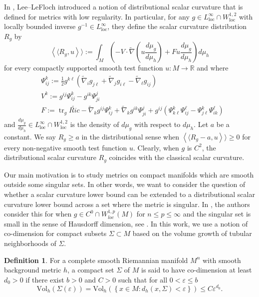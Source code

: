 \documentclass[12pt]{amsart}
\def\tr{\operatorname{tr}}
\theoremstyle{plain}
\theoremstyle{plain}
\theoremstyle{definition}
\newtheorem{definition}[subsection]{Definition}
\theoremstyle{remark}
\numberwithin{equation}{subsection}
\newcommand{\hdel}{\tilde{\nabla}}
\begin{document}
In \cite{lee_positive_2015}, Lee--LeFloch introduced a notion of distributional scalar curvature that is defined for metrics with low regularity. In particular, for any $g \in L^\infty_{\text{loc}}\cap W^{1,2}_{\text{loc}}$ with locally bounded inverse $g^{-1}\in L^\infty_{\text{loc}}$, they define the scalar curvature distribution $R_g$ by
\begin{equation}\label{eqn:distributional-scalar-defn}
    \left\langle\langle R_g, u\right\rangle\rangle := \int_M \left(-V\cdot\hdel\left(u\frac{d\mu_g}{d\mu_h}\right)+Fu\frac{d\mu_g}{d\mu_h}\right)d\mu_h
\end{equation}
for every compactly supported smooth test function $u:M\to\mathbb{R}$ and where
\begin{align*}
    &\Psi^k_{ij} := \frac{1}{2}g^{k\ell}\left(\hdel_ig_{j\ell}+\hdel_jg_{i\ell}-\hdel_{\ell}g_{ij}\right) \\
    &V^k := g^{ij}\Psi^{k}_{ij} - g^{ik}\Psi^{j}_{ji} \\
    &F := \tr_g\widetilde{Ric} - \hdel_kg^{ij}\Psi^k_{ij} + \hdel_kg^{ik}\Psi^{j}_{ji} + g^{ij}\left(\Psi^{k}_{k\ell}\Psi^{\ell}_{ij} - \Psi^{k}_{j\ell}\Psi^{\ell}_{ik}\right)
\end{align*}
and $\frac{d\mu_g}{d\mu_h}\in L^\infty_{\text{loc}}\cap W^{1,2}_{\text{loc}}$ is the density of $d\mu_g$ with respect to $d\mu_h$. Let $a$ be a constant. We say $R_g \geq a$ in the distributional sense when $    \left\langle\langle R_g-a, u\right\rangle\rangle\geq 0$ for every non-negative smooth test function $u$. Clearly, when $g$ is $C^2$, the distributional scalar curvature $R_g$ coincides with the classical scalar curvature.

Our main motivation is to study metrics on compact manifolds which are smooth outside some singular sets. In other words, we want to consider the question of whether a scalar curvature lower bound can be extended to a distributional scalar curvature lower bound across a set where the metric is singular.  In \cite{jiang_removable_2022}, the authors consider this for when $g \in C^0 \cap W^{1,p}_{loc}(M)$ for $n \leq p \leq \infty$ and the singular set is small in the sense of Hausdorff dimension, see  \cite[Lemma 2.7]{jiang_removable_2022}. In this work, we use a notion of co-dimension for compact subsets $\Sigma \subset M$ based on the volume growth of tubular neighborhoods of $\Sigma$.

\begin{definition}
\label{defn:codim}
For a complete smooth Riemannian manifold $M^n$ with smooth background metric $h$, a compact set $\Sigma$ of $M$ is said to have co-dimension at least $d_0 > 0$ if there exist $b > 0$ and $C > 0$ such that for all $0 < \varepsilon \leq b$
\begin{equation*}
    \text{Vol}_h\left(\Sigma(\varepsilon)\right) = \text{Vol}_h\left(\left\{x \in M : d_h(x,\Sigma) < \varepsilon\right\}\right) \leq C\varepsilon^{d_0}.
\end{equation*}
    
\end{definition}
\end{document}
